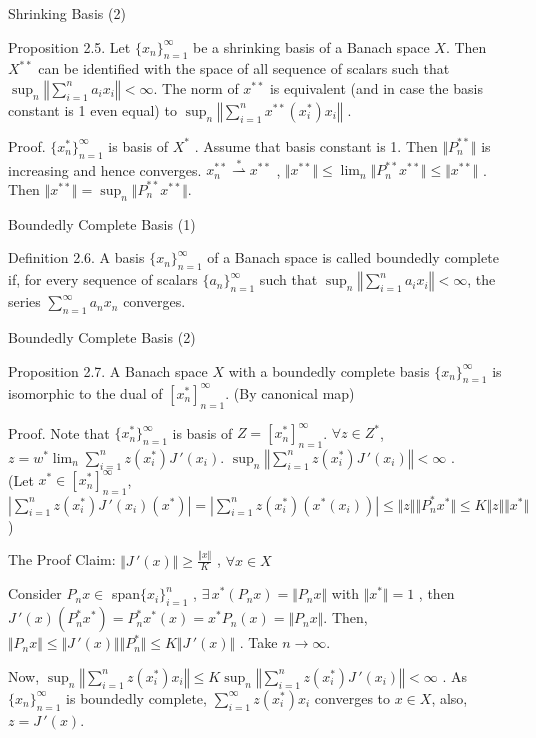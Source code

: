\documentclass{beamer}
\newcommand{\xn}{\{x_n\}_{n=1}^\infty}
\newcommand{\xnsum}{\sum_{n=1}^\infty a_n x_n}
\newcommand{\xnsumn}{\sum_{i=1}^n a_i x_i}
\newcommand{\xns}{\{x_n^*\}_{n=1}^\infty}
\newcommand{\wsconverge}{\mathop{\rightharpoonup}\limits^{*}}
\begin{document}
\begin{frame}{Shrinking Basis (2)}
    \begin{block}{Proposition 2.5.}
        Let $\xn$ be a shrinking basis of a Banach space $X$. Then $X^{**}$ can be identified with the space of all sequence of scalars such that $\sup_n \left\Vert \xnsumn \right\Vert < \infty$. The norm of $x^{**}$ is equivalent (and in case the basis constant is 1 even equal) to $\sup_n \left\Vert \sum_{i=1}^n x^{**}(x_i^*)x_i \right\Vert $ .
    \end{block}
    Proof.     $\xns$ is basis of $X^*$ . Assume that basis constant is 1. Then $\Vert P_n^{**}\Vert$ is increasing and hence converges. $ x_n^{**} \wsconverge x^{**}$ , $\Vert x^{**} \Vert \leq \lim_n \Vert P_n^{**} x^{**} \Vert \leq \Vert x^{**} \Vert$ . Then $\Vert x^{**} \Vert = \sup_n \Vert P_n^{**} x^{**} \Vert$.
\end{frame}
\begin{frame}{Boundedly Complete Basis (1)}
    \begin{block}{Definition 2.6.}
        A basis $\xn$ of a Banach space is called boundedly complete if, for every sequence of scalars $\{a_n\}_{n=1}^\infty$ such that $\sup_n \left\Vert \xnsumn \right\Vert < \infty$, the series $\xnsum$ converges. 
    \end{block}
   
\end{frame}
\begin{frame}{Boundedly Complete Basis (2)}
     \begin{block}{Proposition 2.7.}
        A Banach space $X$ with a boundedly complete basis $\xn$ is isomorphic to the dual of $[x_n^*]_{n=1}^\infty$. (By canonical map)
    \end{block}
    Proof. Note that $\xns$ is basis of $Z=[x_n^*]_{n=1}^\infty$.
    $\forall z \in Z^*$, $z=w^*\lim_n \sum_{i=1}^n z(x_i^*)J\,'(x_i)$. $\sup_n\left\Vert \sum_{i=1}^n z(x_i^*)J\,'(x_i) \right\Vert< \infty$ . \\
    (Let $x^* \in [x_n^*]_{n=1}^\infty$, $\left\vert \sum_{i=1}^n z(x_i^*)J\,'(x_i)(x^*)\right\vert = \left\vert\sum_{i=1}^n z(x_i^*)(x^*(x_i))\right\vert \leq \Vert z \Vert \Vert P_n^*x^* \Vert \leq K\Vert z \Vert \Vert x^* \Vert$ )\\ 
    
\end{frame}
\begin{frame}{The Proof}
    Claim: $\Vert J\,'(x) \Vert \geq \frac{\Vert x \Vert}{K}$ , $\forall x \in X$

    Consider $P_nx \in $ span$\{x_i\}_{i=1}^n$ , $\exists \,x^*(P_nx)=\Vert P_nx \Vert$ with $\Vert x^* \Vert=1$ , then $J\,'(x)(P_n^*x^*)=P_n^*x^*(x)=x^*P_n(x)=\Vert P_nx \Vert$. 
    Then, $\Vert P_nx \Vert \leq \Vert J\,'(x)\Vert \Vert P_n^*\Vert \leq K\Vert J\,'(x) \Vert $ . Take $n\to \infty$.

    Now, $\sup_n\left \Vert \sum_{i=1}^n z(x_i^*)x_i \right\Vert \leq K\sup_n\left \Vert \sum_{i=1}^n z(x_i^*)J\,'(x_i) \right\Vert < \infty$ . As $\xn$ is boundedly complete, $\sum_{i=1}^\infty z(x_i^*)x_i$ converges to $x\in X$, also, $z=J\,'(x)$.
\end{frame}
\end{document}
